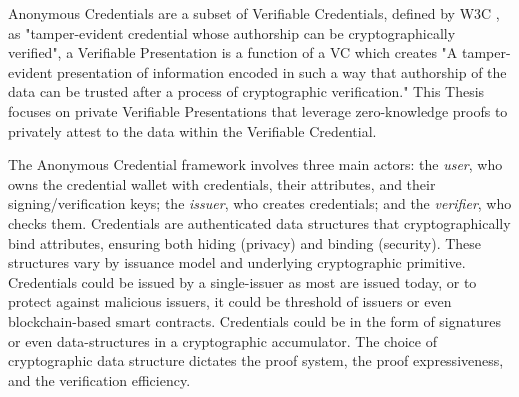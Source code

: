 Anonymous Credentials are a subset of Verifiable Credentials, defined by W3C  \cite{w3c_verifiable_2025}, as "tamper-evident credential whose authorship can be cryptographically verified", a Verifiable Presentation is a function of a VC which creates "A tamper-evident presentation of information encoded in such a way that authorship of the data can be trusted after a process of cryptographic verification." This Thesis focuses on private Verifiable Presentations that leverage zero-knowledge proofs to privately attest to the data within the Verifiable Credential. 

The Anonymous Credential framework involves three main actors: the \emph{user}, who owns the credential wallet with credentials, their attributes, and their signing/verification keys; the \emph{issuer}, who creates credentials; and the \emph{verifier}, who checks them. Credentials are authenticated data structures that cryptographically bind attributes, ensuring both hiding (privacy) and binding (security). These structures vary by issuance model and underlying cryptographic primitive. Credentials could be issued by a single-issuer as most are issued today, or to protect against malicious issuers, it could be threshold of issuers or even blockchain-based smart contracts. Credentials could be in the form of signatures or even data-structures in a cryptographic accumulator. The choice of cryptographic data structure dictates the proof system, the proof expressiveness, and the verification efficiency.


